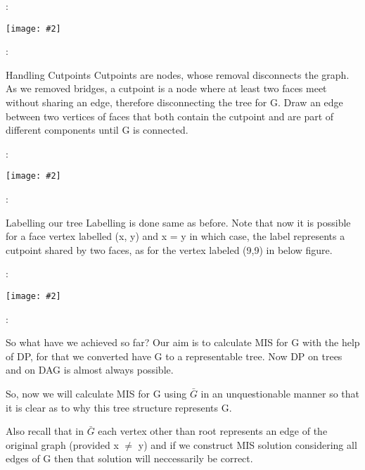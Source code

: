 \documentclass{beamer}
\newcommand{\iph}[2]{
    \texttt{[image: \#2]}
}
\begin{document}
\begin{frame}{\secname : \subsecname}
    \iph{0.9}{lin2}

\end{frame}

\begin{frame}{\secname : \subsecname}
    \begin{block}{Handling Cutpoints}
        Cutpoints are nodes,
whose removal disconnects the graph. As we removed bridges, a cutpoint
is a node where at least two faces meet without
sharing an edge, therefore disconnecting the tree for
G. Draw an edge between two vertices of faces that
both contain the cutpoint and are part of different
components until G is connected.
    \end{block}
\end{frame}

\begin{frame}{\secname : \subsecname}
    \iph{0.9}{lin3}

\end{frame}

\begin{frame}{\secname : \subsecname}
    \begin{block}{Labelling our tree}
        Labelling is done same as before. Note that now it is possible for a face vertex labelled (x, y) and x = y in which case, the label
        represents a cutpoint shared by two faces, as for the vertex labeled (9,9) in
        below figure.
    \end{block}

\end{frame}

\begin{frame}{\secname : \subsecname}
    \iph{0.9}{lin4}

\end{frame}

\begin{frame}{\secname : \subsecname}
    \begin{block}{So what have we achieved so far?}
        Our aim is to calculate MIS for G with the help of DP, for that we converted have G to a representable tree. Now DP on trees and on DAG is almost always possible. 
        
        So, now we will calculate MIS for G using $\bar{G}$ in an unquestionable manner so that it is clear as to why this tree structure represents G. 
        
        Also recall that in $\bar{G}$ each vertex other than root represents an edge of the original graph (provided x $\neq$ y) and if we construct MIS solution considering all edges of G then that solution will neccessarily be correct.
    \end{block}
\end{frame}
\end{document}
